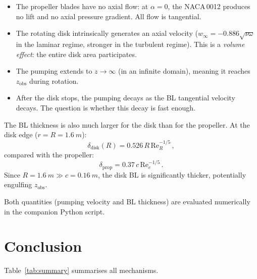 \documentclass[11pt,a4paper]{article}
\begin{document}
\begin{itemize}
  \item The propeller blades have no axial flow: at $\alpha = 0$, the
        NACA\,0012 produces no lift and no axial pressure gradient. All
        flow is tangential.
  \item The rotating disk intrinsically generates an axial velocity
        ($w_\infty = -0.886\sqrt{\nu\omega}$ in the laminar regime,
        stronger in the turbulent regime). This is a \emph{volume effect}:
        the entire disk area participates.
  \item The pumping extends to $z \to \infty$ (in an infinite domain),
        meaning it reaches $z_\mathrm{obs}$ during rotation.
  \item After the disk stops, the pumping decays as the BL tangential
        velocity decays. The question is whether this decay is fast
        enough.
\end{itemize}

The BL thickness is also much larger for the disk than for the
propeller. At the disk edge ($r = R = \SI{1.6}{m}$):
\begin{equation}
  \delta_\mathrm{disk}(R) = 0.526\,R\,\mathrm{Re}_R^{-1/5}\,,
\end{equation}
compared with the propeller:
\begin{equation}
  \delta_\mathrm{prop} = 0.37\,c\,\mathrm{Re}_c^{-1/5}\,.
\end{equation}
Since $R = \SI{1.6}{m} \gg c = \SI{0.16}{m}$, the disk BL is
significantly thicker, potentially engulfing $z_\mathrm{obs}$.

Both quantities (pumping velocity and BL thickness) are evaluated
numerically in the companion Python script.


\section{Conclusion}
\label{sec:conclusion}

Table~\ref{tab:summary} summarises all mechanisms.
\end{document}
